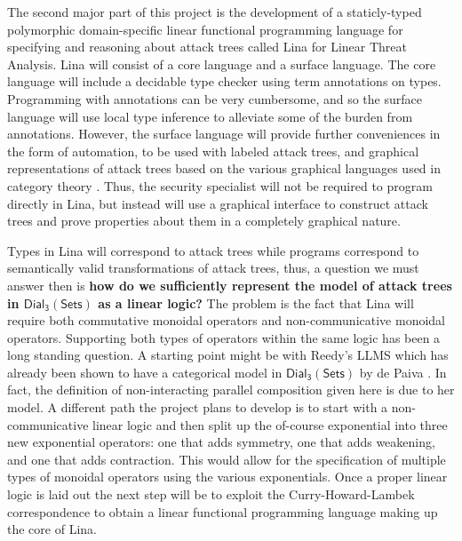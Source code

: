 \documentclass{llncs}
\newcommand{\dial}[0]{\mathsf{Dial_3}(\mathsf{Sets})}
\begin{document}
The second major part of this project is the development of a
staticly-typed polymorphic domain-specific linear functional
programming language for specifying and reasoning about attack trees
called Lina for Linear Threat Analysis.  Lina will consist of a core
language and a surface language.  The core language will include a
decidable type checker using term annotations on types.  Programming
with annotations can be very cumbersome, and so the surface language
will use local type inference \cite{Pierce:2000} to alleviate some of
the burden from annotations.  However, the surface language will
provide further conveniences in the form of automation, to be used
with labeled attack trees, and graphical representations of attack
trees based on the various graphical languages used in category theory
\cite{Selinger:2009}.  Thus, the security specialist will not be
required to program directly in Lina, but instead will use a graphical
interface to construct attack trees and prove properties about them in
a completely graphical nature.  

Types in Lina will correspond to attack trees while programs
correspond to semantically valid transformations of attack trees,
thus, a question we must answer then is \textbf{how do we sufficiently
  represent the model of attack trees in $\dial$ as a linear logic?}
The problem is the fact that Lina will require both commutative
monoidal operators and non-communicative monoidal
operators. Supporting both types of operators within the same logic
has been a long standing question.  A starting point might be with
Reedy's LLMS which has already been shown to have a categorical model
in $\dial$ by de Paiva \cite{dePaiva:2014a}.  In fact, the definition
of non-interacting parallel composition given here is due to her
model.  A different path the project plans to develop is to start with
a non-communicative linear logic and then split up the of-course
exponential into three new exponential operators: one that adds
symmetry, one that adds weakening, and one that adds contraction.
This would allow for the specification of multiple types of monoidal
operators using the various exponentials.  Once a proper linear logic
is laid out the next step will be to exploit the Curry-Howard-Lambek
correspondence to obtain a linear functional programming language
making up the core of Lina.
\end{document}
